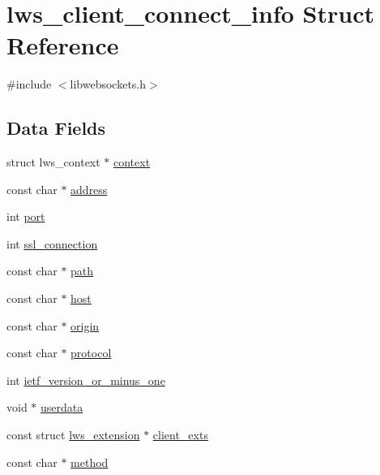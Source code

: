 \hypertarget{structlws__client__connect__info}{}\section{lws\+\_\+client\+\_\+connect\+\_\+info Struct Reference}
\label{structlws__client__connect__info}


{\ttfamily \#include $<$libwebsockets.\+h$>$}

\subsection*{Data Fields}
\begin{DoxyCompactItemize}
\item 
struct lws\+\_\+context $\ast$ \hyperlink{structlws__client__connect__info_afe999d133cc240a0bfd02aade0514cfd}{context}
\item 
const char $\ast$ \hyperlink{structlws__client__connect__info_aa364094f94ef1bcaaabbd9161971d502}{address}
\item 
int \hyperlink{structlws__client__connect__info_a1af124d81c3c22a46d39387c5bc3d6b9}{port}
\item 
int \hyperlink{structlws__client__connect__info_a9862297827639238a7a0b4054c3ddf3d}{ssl\+\_\+connection}
\item 
const char $\ast$ \hyperlink{structlws__client__connect__info_a76a8388733f114fb8fd3643874781185}{path}
\item 
const char $\ast$ \hyperlink{structlws__client__connect__info_a9b36d47c3422329df32c21040a35ebc7}{host}
\item 
const char $\ast$ \hyperlink{structlws__client__connect__info_a8595f83e64147cb687b6418cf500dd4c}{origin}
\item 
const char $\ast$ \hyperlink{structlws__client__connect__info_aba35adfb74845a5fd0c3dc141cbdddd2}{protocol}
\item 
int \hyperlink{structlws__client__connect__info_a69abb5aeed755750b9755e5c91db6895}{ietf\+\_\+version\+\_\+or\+\_\+minus\+\_\+one}
\item 
void $\ast$ \hyperlink{structlws__client__connect__info_a9831b9f9ab54a1aec4bb15324f1c3836}{userdata}
\item 
const struct \hyperlink{structlws__extension}{lws\+\_\+extension} $\ast$ \hyperlink{structlws__client__connect__info_a7732b996e977393c3e1076be2a8ded6c}{client\+\_\+exts}
\item 
const char $\ast$ \hyperlink{structlws__client__connect__info_aa9e8e3da4e783a0651b0dea62c2dd1db}{method}

\end{DoxyCompactItemize}
